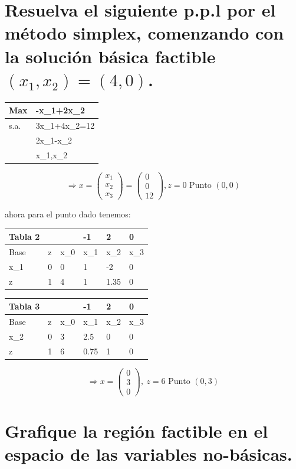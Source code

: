 \section{Resuelva el siguiente p.p.l por el método simplex, comenzando con la
solución básica factible $(x_1, x_2) = (4,0)$.}
\begin{tabular}{|l|l|}
\hline
Max  & -x_1+2x_2        \\ \hline
s.a. & 3x_1+4x_2=12     \\ \hline
     & 2x_1-x_2 \leq 12 \\ \hline
     & x_1,x_2 \geq 0   \\ \hline
\end{tabular}
$$\Rightarrow x=\begin{pmatrix}x_1\\ x_2\\ x_3\end{pmatrix}=\begin{pmatrix}0\\ 0\\ 12\end{pmatrix}, z=0 \mbox{  Punto $(0,0 )$}$$

ahora para el punto dado tenemos:

\begin{tabular}{|l|l|l|l|l|l|}
\hline
Tabla 2 &   &     & -1  & 2    & 0   \\ \hline
Base    & z & x_0 & x_1 & x_2  & x_3 \\ \hline
x_1     & 0 & 0   & 1   & -2   & 0   \\ \hline
z       & 1 & 4   & 1   & 1.35 & 0   \\ \hline
\end{tabular}
\Rightarrow
\begin{tabular}{|l|l|l|l|l|l|}
\hline
Tabla 3 &   &     & -1   & 2   & 0   \\ \hline
Base    & z & x_0 & x_1  & x_2 & x_3 \\ \hline
x_2     & 0 & 3   & 2.5  & 0   & 0   \\ \hline
z       & 1 & 6   & 0.75 & 1   & 0   \\ \hline
\end{tabular}

$$\Rightarrow x=\begin{pmatrix}0\\ 3\\ 0\end{pmatrix},\: z=6 \mbox{ Punto } (0,3)$$

\section*{Grafique la región factible en el espacio de las variables no-básicas.}

